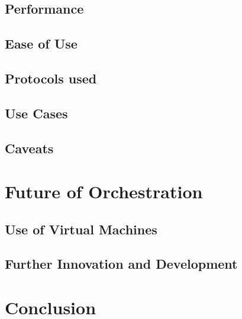 \documentclass[10pt,twocolumn]{article}
\begin{document}
\subsection{Performance}



\subsection{Ease of Use}



\subsection{Protocols used}



\subsection{Use Cases}



\subsection{Caveats}




\section{Future of Orchestration}



\subsection{Use of Virtual Machines}



\subsection{Further Innovation and Development}



\section{Conclusion}





\end{document}

